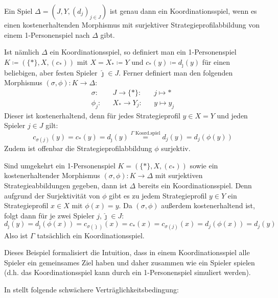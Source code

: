 \begin{bsp}\label{bsp:Koordinationsspiel}
	Ein Spiel $\Delta = (J, Y, (d_j)_{j \in J})$ ist genau dann ein Koordinationsspiel, wenn es einen kostenerhaltenden Morphismus mit surjektiver Strategieprofilabbildung von einem 1-Personenspiel nach $\Delta$ gibt.
	
	Ist nämlich $\Delta$ ein Koordinationsspiel, so definiert man ein 1-Personenspiel $K \coloneqq (\{\ast\}, X, (c_\ast))$ mit $X = X_\ast \coloneqq Y$ und $c_\ast(y) \coloneqq d_{\hat{\jmath}}(y)$ für einen beliebigen, aber festen Spieler $\hat{\jmath} \in J$. Ferner definiert man den folgenden Morphismus $(\sigma, \phi): K \to \Delta$:
	\begin{align*}
		\sigma:	&&J		\to	 \{\ast\}:	&&j	\mapsto	\ast  \\
		\phi_j:	&&X_\ast	\to	 Y_j:	&&y	\mapsto	y_j
	\end{align*}	
	Dieser ist kostenerhaltend, denn für jedes Strategieprofil $y \in X = Y$ und jeden Spieler $j \in J$ gilt:
	\[c_{\sigma(j)}(y) = c_\ast(y) = d_{\hat{\jmath}}(y) \overset{\Gamma \text{ Koord.spiel}}{=} d_j(y) = d_j(\phi(y))\]
	Zudem ist offenbar die Strategieprofilabbildung $\phi$ surjektiv.
	
	Sind umgekehrt ein 1-Personenspiel $K = (\{\ast\}, X, (c_\ast))$ sowie ein kostenerhaltender Morphismus  $(\sigma, \phi): K \to \Delta$ mit surjektiven Strategieabbildungen gegeben, dann ist $\Delta$ bereits ein Koordinationsspiel. Denn aufgrund der Surjektivität von $\phi$ gibt es zu jedem Strategieprofil $y \in Y$ ein Strategieprofil $x \in X$ mit $\phi(x) = y$. Da $(\sigma, \phi)$ außerdem kostenerhaltend ist, folgt dann für je zwei Spieler $j, \hat{\jmath} \in J$: 
		\[d_{\hat{\jmath}}(y) = d_{\hat{\jmath}}(\phi(x)) = c_{\sigma(\hat{\jmath})}(x) = c_\ast(x) = c_{\sigma(j)}(x) = d_j(\phi(x)) = d_j(y)\]
	Also ist $\Gamma$ tatsächlich ein Koordinationsspiel.
\end{bsp}

Dieses Beispiel formalisiert die Intuition, dass in einem Koordinationsspiel alle Spieler ein gemeinsames Ziel haben und daher zusammen \glqq wie ein Spieler\grqq{} spielen (d.h. das Koordinationsspiel kann durch ein 1-Personenspiel simuliert werden).

%	

In \cite{LapGameCat} stellt \citeauthor[Definition 4.1]{LapGameCat} folgende schwächere Verträglichkeitsbedingung:

